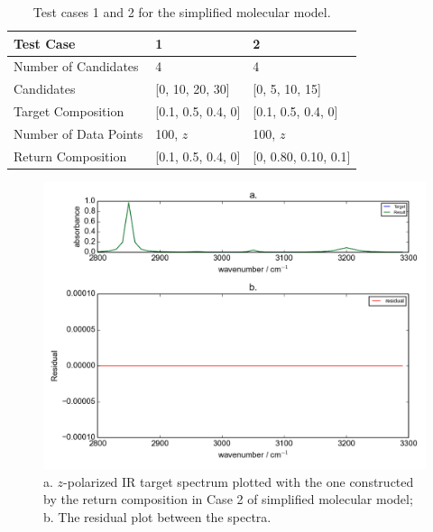 \begin{table}[ht!]
\begin{center}
{\def\arraystretch{1.5}
\begin{tabular}{| l | l | l | }
\hline
Test Case & 1 & 2  \\
\hline
Number of Candidates & 4 & 4  \\
\hline
Candidates & [0, 10, 20, 30] & [0, 5, 10, 15] \\
\hline
Target Composition & [0.1, 0.5, 0.4, 0] & [0.1, 0.5, 0.4, 0]     \\
\hline
Number of Data Points & 100, $z$ &  100, $z$     \\
\hline
Return Composition & [0.1, 0.5, 0.4, 0] & [0, 0.80, 0.10, 0.1] \\
\hline
\end{tabular} 
}
\end{center}
\caption{Test cases 1 and 2 for the simplified molecular model.}
\label{tab:3.1}
\end{table}	

\begin{figure}[!ht] 
\includegraphics[scale=0.7]{Figures/toy_model_result_plotting_ir_cos_4candi_1.png}
\caption{a. $z$-polarized IR target spectrum plotted with the one constructed by the return composition in Case 2 of simplified molecular model; b. The residual plot between the spectra.}
\label{fig:3.2}
\end{figure}

